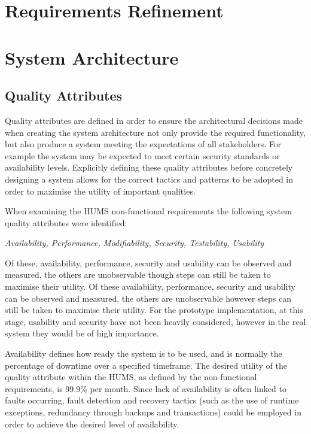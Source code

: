\documentclass[10pt,a4paper]{article}
\begin{document}
\section{Requirements Refinement}

\section{System Architecture}
\subsection{Quality Attributes}
Quality attributes are defined in order to ensure the architectural decisions made when creating the system architecture not only provide the required functionality, but also produce a system meeting the expectations of all stakeholders. For example the system may be expected to meet certain security standards or availability levels. Explicitly defining these quality attributes before concretely designing a system allows for the correct tactics and patterns to be adopted in order to maximise the utility of important 
qualities.

When examining the HUMS non-functional requirements the following system quality attributes were identified:
	\begin{center}
	\textit{
		Availability, Performance, Modifiability, Security, Testability, Usability}
	\end{center}
Of these, availability, performance, security and usability can be observed and measured, the others are unobservable though steps can still be taken to maximise their utility.
Of these availability, performance, security and usability can be observed and measured, the others are unobservable however steps can still be taken to maximise their utility. For the prototype implementation, at this stage, usability and security have not been heavily considered, however in the real system they would be of high importance.

Availability defines how ready the system is to be used, and is normally the percentage of downtime over a specified timeframe. The desired utility of the quality attribute within the HUMS, as defined by the non-functional requirements, is  99.9\% per month. Since lack of availability is often linked to faults occurring, fault detection and recovery tactics (such as the use of runtime exceptions, redundancy through backups and transactions) could be employed in order to achieve the desired level of availability. 
\end{document}
